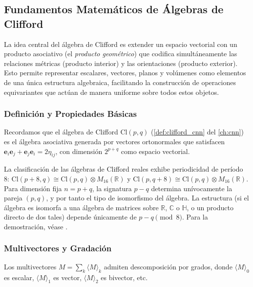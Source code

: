 \subsection{Fundamentos Matemáticos de Álgebras de Clifford}

La idea central del álgebra de Clifford es extender un espacio vectorial con un producto asociativo (el \textit{producto geométrico}) que codifica simultáneamente las relaciones métricas (producto interior) y las orientaciones (producto exterior). Esto permite representar escalares, vectores, planos y volúmenes como elementos de una única estructura algebraica, facilitando la construcción de operaciones equivariantes que actúan de manera uniforme sobre todos estos objetos.

\subsubsection{Definición y Propiedades Básicas}

Recordamos que el álgebra de Clifford $\text{Cl}(p,q)$ (\autoref{def:clifford_cnn} del \autoref{ch:cnn}) es el álgebra asociativa generada por vectores ortonormales que satisfacen $\mathbf{e}_i \mathbf{e}_j + \mathbf{e}_j \mathbf{e}_i = 2\eta_{ij}$, con dimensión $2^{p+q}$ como espacio vectorial.\label{def:algebra_clifford}

\begin{theorem}\label{thm:clasificacion_clifford}
La clasificación de las álgebras de Clifford reales exhibe periodicidad de período 8: $\text{Cl}(p+8, q) \cong \text{Cl}(p, q) \otimes M_{16}(\mathbb{R})$ y $\text{Cl}(p, q+8) \cong \text{Cl}(p, q) \otimes M_{16}(\mathbb{R})$. Para dimensión fija $n = p + q$, la signatura $p - q$ determina unívocamente la pareja $(p,q)$, y por tanto el tipo de isomorfismo del álgebra. La estructura (si el álgebra es isomorfa a una álgebra de matrices sobre $\mathbb{R}$, $\mathbb{C}$ o $\mathbb{H}$, o un producto directo de dos tales) depende únicamente de $p - q \pmod{8}$. Para la demostración, véase \citep{lawson1989spin}.
\end{theorem}

\subsubsection{Multivectores y Gradación}

Los multivectores $M = \sum_k \langle M \rangle_k$ admiten descomposición por grados, donde $\langle M \rangle_0$ es escalar, $\langle M \rangle_1$ es vector, $\langle M \rangle_2$ es bivector, etc.\label{def:multivector}

